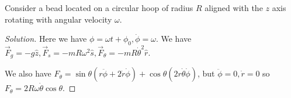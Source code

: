 \begin{prb}
Consider a bead located on a circular hoop of radius $R$ aligned with
the $z$ axis rotating with angular velocity $\omega$.
\end{prb}

\begin{proof}[Solution]
Here we have $\phi = \omega t + \phi_0, \dot{\phi} = \omega$. We have
$\vec{F}_g = -g\hat{z}, \vec{F}_s = -mR \omega^2 \hat{s}, \vec{F}_\theta
= -mR \dot{\theta}^2 \hat{r}$.

We also have $F_\theta = \sin \theta (r \ddot{\phi} + 2 \dot{r}
\dot{\phi}) + \cos \theta (2 r \dot{\theta} \dot{\phi})$, but
$\ddot{\phi} = 0, \dot{r} = 0$ so $F_\theta = 2 R \omega \dot{\theta}
\cos \theta$.
\end{proof}
